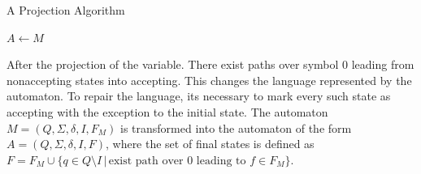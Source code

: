 \documentclass[pdflatex,sn-mathphys-num]{sn-jnl}%
\theoremstyle{thmstyleone}%
\theoremstyle{thmstyletwo}%
\theoremstyle{thmstylethree}%
\begin{document}
        \begin{algorithm}
            \caption{A Projection Algorithm}
            \small
            \DontPrintSemicolon

            \vspace*{0.5em}

            $A \leftarrow M$\;




        \end{algorithm}

        After the projection of the variable. There exist paths over symbol 0 leading from nonaccepting states into accepting. This changes the language represented by the automaton. To repair the language, its necessary to mark every such state as accepting with the exception to the initial state. The automaton $M = (Q, \Sigma, \delta, I, F_M)$ is transformed into the automaton of the form $A = (Q, \Sigma, \delta, I, F)$, where the set of final states is defined as $F = F_M \cup \{q \in Q\setminus I\,|\, \text{exist path over 0 leading to } f \in F_M\}$.
\end{document}
